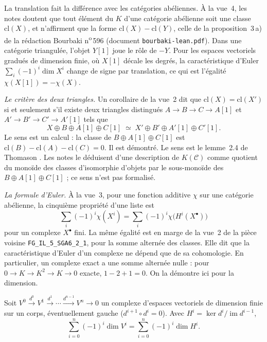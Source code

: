 \begin{remarque}
La translation fait la différence avec les catégories abéliennes. À la vue~4, les notes doutent que tout élément du $K$ d'une catégorie abélienne soit une classe $\mathrm{cl}(X)$, et n'affirment que la forme $\mathrm{cl}(X) - \mathrm{cl}(Y)$, celle de la proposition~3\,a) de la rédaction Bourbaki n\textsuperscript{o}\,596 (document \texttt{bourbaki-lean.pdf}). Dans une catégorie triangulée, l'objet $Y[1]$ joue le rôle de $-Y$. Pour les espaces vectoriels gradués de dimension finie, où $X[1]$ décale les degrés, la caractéristique d'Euler $\sum_i (-1)^i \dim X^i$ change de signe par translation, ce qui est l'égalité $\chi(X[1]) = -\chi(X)$.
\end{remarque}

\emph{Le critère des deux triangles.} Un corollaire de la vue~2 dit que $\mathrm{cl}(X) = \mathrm{cl}(X')$ si et seulement s'il existe deux triangles distingués $A \to B \to C \to A[1]$ et $A' \to B' \to C' \to A'[1]$ tels que
\[
  X \oplus B \oplus A[1] \oplus C[1] \;\simeq\; X' \oplus B' \oplus A'[1] \oplus C'[1].
\]
Le sens  est un calcul : la classe de $B \oplus A[1] \oplus C[1]$ est $\mathrm{cl}(B) - \mathrm{cl}(A) - \mathrm{cl}(C) = 0$. Il est démontré. Le sens  est le lemme~2.4 de Thomason \cite{thomason1997}. Les notes le déduisent d'une description de $K(\mathcal C)$ comme quotient du monoïde des classes d'isomorphie d'objets par le sous-monoïde des $B \oplus A[1] \oplus C[1]$ ; ce sens n'est pas formalisé.

\emph{La formule d'Euler.} À la vue~3, pour une fonction additive $\chi$ sur une catégorie abélienne, la cinquième propriété d'une liste est
\[
  \sum_i (-1)^i \chi(X^i) = \sum_i (-1)^i \chi\bigl(H^i(X^\bullet)\bigr)
\]
pour un complexe $X^\bullet$ fini. La même égalité est en marge de la vue~2 de la pièce voisine \texttt{FG\_IL\_5\_SGA6\_2\_1}, pour la somme alternée des classes. Elle dit que la caractéristique d'Euler d'un complexe ne dépend que de sa cohomologie. En particulier, un complexe exact a une somme alternée nulle : pour $0 \to K \to K^2 \to K \to 0$ exacte, $1 - 2 + 1 = 0$. On la démontre ici pour la dimension.

\begin{encadre}
\begin{enonce}[Notes, vue~3, propriété~5, pour $\chi = \dim$]
Soit $V^0 \xrightarrow{d^0} V^1 \xrightarrow{d^1} \cdots \xrightarrow{d^{n-1}} V^n \to 0$ un complexe d'espaces vectoriels de dimension finie sur un corps, éventuellement gauche ($d^{i+1} \circ d^i = 0$). Avec $H^i = \ker d^i / \operatorname{im} d^{i-1}$,
\[
  \sum_{i=0}^{n} (-1)^i \dim V^i = \sum_{i=0}^{n} (-1)^i \dim H^i .
\]
\end{enonce}
\end{encadre}

